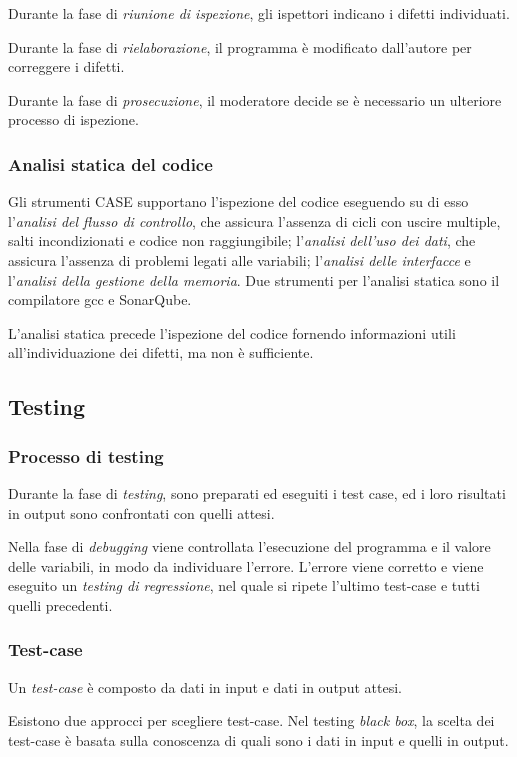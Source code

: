 \documentclass[11pt]{article}
\begin{document}
Durante la fase di \textit{riunione di ispezione}, gli ispettori indicano i difetti individuati.

Durante la fase di \textit{rielaborazione}, il programma è modificato dall'autore per correggere i difetti.

Durante la fase di \textit{prosecuzione}, il moderatore decide se è necessario un ulteriore processo di ispezione.
\subsubsection*{Analisi statica del codice}
Gli strumenti CASE supportano l'ispezione del codice eseguendo su di esso l'\textit{analisi del flusso di controllo}, 
che assicura l'assenza di cicli con uscire multiple, salti incondizionati e codice non raggiungibile; l'\textit{analisi 
dell'uso dei dati}, che assicura l'assenza di problemi legati alle variabili; l'\textit{analisi delle interfacce} e 
l'\textit{analisi della gestione della memoria}. Due strumenti per l'analisi statica sono il compilatore gcc e SonarQube.

L'analisi statica precede l'ispezione del codice fornendo informazioni utili all'individuazione dei difetti, ma non è 
sufficiente.
\subsection{Testing}
\subsubsection*{Processo di testing}
Durante la fase di \textit{testing}, sono preparati ed eseguiti i test case, ed i loro risultati in output sono confrontati 
con quelli attesi.

Nella fase di \textit{debugging} viene controllata l'esecuzione del programma e il valore delle variabili, in modo da 
individuare l'errore. L'errore viene corretto e viene eseguito un \textit{testing di regressione}, nel quale si ripete 
l'ultimo test-case e tutti quelli precedenti.
\subsubsection{Test-case}
Un \textit{test-case} è composto da dati in input e dati in output attesi. 

Esistono due approcci per scegliere test-case. Nel testing \textit{black box}, la scelta dei test-case è basata sulla 
conoscenza di quali sono i dati in input e quelli in output. 
\end{document}
